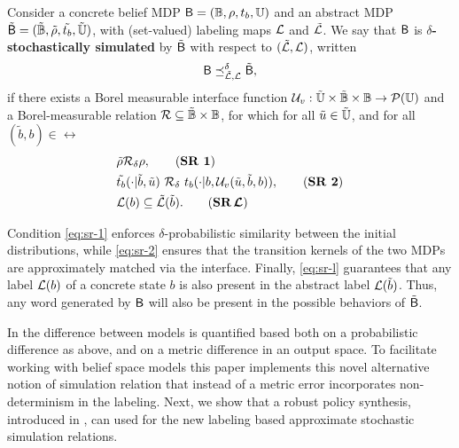 \documentclass{ifacconf}
\newcommand{\red}[1]{{\color{red} #1}}
\newcommand{\new}[1]{{\color{blue}#1}}
\begin{document}
\begin{definition}
\label{def:apbsim}
Consider a concrete belief MDP $\mathsf{B} = (\mathbb{B}, \rho, t_b, {\mathbb{U}})$ and an abstract MDP $\tilde{\mathsf{B}} = (\tilde {\mathbb{B}}, \tilde \rho, \tilde {t_b}, \tilde {{\mathbb{U}}})$, with (set-valued) labeling maps $\mathcal{L}$ and  $\tilde{\mathcal{L}}$. We say that	$\mathsf{B}$ is \textbf{$\delta$-stochastically simulated} by $\tilde {\mathsf{B}}$ with respect to $(\tilde{\mathcal{L}},\mathcal{L})$, written
\begin{equation}
  {\mathsf{B}}\preceq^{\delta}_{\tilde{\mathcal{L}},\mathcal{L}} \tilde {\mathsf{B}},
\end{equation}
if there exists a \red{Borel measurable interface function $\mathcal{U}_{v} : \tilde {{\mathbb{U}}} \times \tilde {\mathbb{B}} \times \mathbb{B} \rightarrow \mathcal P({\mathbb{U}})$} and a Borel-measurable relation $\mathcal{R}\subseteq \tilde {\mathbb{B}}\times \mathbb{B}$, for which for all  $ \tilde u\in \tilde {{\mathbb{U}}}$, and for all $ (\tilde b,b)\in \rel$
\begin{align}
  \label{eq:sr-1} & \tilde\init \bar \rel_\delta \init, \tag{\textbf{SR 1}} \\
  \label{eq:sr-2} &  \tilde \trb(\cdot| \tilde b, \tilde u)\ \bar \rel_\delta \  \trb(\cdot| b, \InF(\tilde u,\tilde b,b)), \tag{\textbf{SR 2}} \\
  \label{eq:sr-l} & %
   \Labset(b)\subseteq \tilde{\Labset}(\tilde b).\tag{\textbf{SR$\,\boldsymbol{\CA{L}}$}}
\end{align}

\end{definition}

Condition \eqref{eq:sr-1} enforces $\delta$-probabilistic similarity between the initial distributions, while \eqref{eq:sr-2} ensures that the transition kernels of the two MDPs are approximately matched via the interface. Finally, \eqref{eq:sr-l} guarantees that any label $\mathcal{L}(b)$ of a concrete state $b$ is also present in the abstract label $\mathcal{L}(\tilde b)$. Thus, any word generated by $\mathsf{B}$ will also be present in the possible behaviors of $\tilde {\mathsf{B}}$.

In \citet{haesaert2017verification} the difference between models is quantified based both on a probabilistic difference as above, and on a metric difference in an output space. To facilitate working with belief space models this paper implements this novel alternative notion of simulation relation that instead of a metric error incorporates non-determinism in the labeling.
\new{Next, we show that a  robust policy synthesis, introduced in \cite{tech_report_TACAS}, can used for the new labeling based approximate stochastic simulation relations.}
\end{document}
